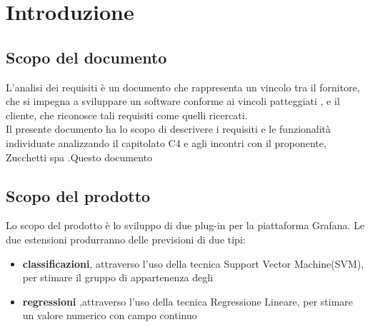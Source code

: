 \section{Introduzione}
	\subsection{Scopo del documento}
	L'analisi dei requisiti è un documento che rappresenta un vincolo tra il fornitore, che si impegna 		a sviluppare un software conforme ai vincoli patteggiati , e il cliente, che riconosce tali 			requisiti come quelli ricercati.
\\	Il presente documento ha lo scopo di descrivere i requisiti e le funzionalità individuate 			    analizzando il capitolato C4 e agli incontri con il proponente, Zucchetti spa .Questo documento 

	\subsection{Scopo del prodotto}
	Lo scopo del prodotto è lo sviluppo di due plug-in per la piattaforma Grafana. Le due estensioni     	produrranno delle previsioni di due tipi:
\\	
	\begin{itemize}
		\item \textbf {classificazioni}, attraverso l'uso della tecnica Support Vector Machine(SVM), per stimare il gruppo di appartenenza degli 
		\item \textbf{regressioni} ,attraverso l'uso della tecnica Regressione Lineare, per stimare un valore numerico con campo continuo
	\end{itemize}